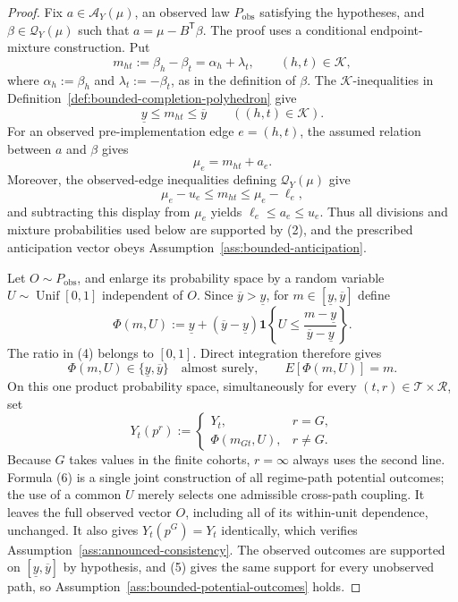 \documentclass{article}
\begin{document}
\begin{proof}
Fix \(a\in\mathcal A_Y(\mu)\), an observed law \(P_{\mathrm{obs}}\) satisfying the hypotheses, and \(\beta\in\mathcal Q_Y(\mu)\) such that \(a=\mu-B^{\mathsf T}\beta\).  The proof uses a conditional endpoint-mixture construction.  Put
\[
 m_{ht}:=\beta_h-\beta_t=\alpha_h+\lambda_t,
 \qquad (h,t)\in\mathcal K,
\tag{1}
\]
where \(\alpha_h:=\beta_h\) and \(\lambda_t:=-\beta_t\), as in the definition of \(\beta\).  The \(\mathcal K\)-inequalities in Definition~\ref{def:bounded-completion-polyhedron} give
\[
 \underline y\le m_{ht}\le\overline y
 \qquad((h,t)\in\mathcal K).
\tag{2}
\]
For an observed pre-implementation edge \(e=(h,t)\), the assumed relation between \(a\) and \(\beta\) gives
\[
 \mu_e=m_{ht}+a_e.
\tag{3}
\]
Moreover, the observed-edge inequalities defining \(\mathcal Q_Y(\mu)\) give
\[
 \mu_e-u_e\le m_{ht}\le\mu_e-\ell_e,
\]
and subtracting this display from \(\mu_e\) yields \(\ell_e\le a_e\le u_e\).  Thus all divisions and mixture probabilities used below are supported by (2), and the prescribed anticipation vector obeys Assumption~\ref{ass:bounded-anticipation}.

Let \(O\sim P_{\mathrm{obs}}\), and enlarge its probability space by a random variable \(U\sim\operatorname{Unif}[0,1]\) independent of \(O\).  Since \(\overline y>\underline y\), for \(m\in[\underline y,\overline y]\) define
\[
 \Phi(m,U):=\underline y+(\overline y-\underline y)
 \mathbf 1\!\left\{U\le
 \frac{m-\underline y}{\overline y-\underline y}\right\}.
\tag{4}
\]
The ratio in (4) belongs to \([0,1]\).  Direct integration therefore gives
\[
 \Phi(m,U)\in\{\underline y,\overline y\}
 \quad\text{almost surely},
 \qquad E[\Phi(m,U)]=m.
\tag{5}
\]
On this one product probability space, simultaneously for every \((t,r)\in\mathcal T\times\mathcal R\), set
\[
 Y_t(p^r):=
 \begin{cases}
 Y_t,&r=G,\\
 \Phi(m_{Gt},U),&r\ne G.
 \end{cases}
\tag{6}
\]
Because \(G\) takes values in the finite cohorts, \(r=\infty\) always uses the second line.  Formula (6) is a single joint construction of all regime-path potential outcomes; the use of a common \(U\) merely selects one admissible cross-path coupling.  It leaves the full observed vector \(O\), including all of its within-unit dependence, unchanged.  It also gives \(Y_t(p^G)=Y_t\) identically, which verifies Assumption~\ref{ass:announced-consistency}.  The observed outcomes are supported on \([\underline y,\overline y]\) by hypothesis, and (5) gives the same support for every unobserved path, so Assumption~\ref{ass:bounded-potential-outcomes} holds.


\end{proof}
\end{document}
